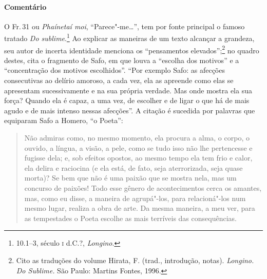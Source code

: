 \medskip

{\paragraph{Comentário} O Fr.\,31 ou \textit{Phaínetaí moi}, ``Parece"-me\ldots{}'', tem por fonte
principal o famoso tratado \textit{Do sublime}.\footnote{10.1--3, século \textsc{i} d.C.?, \textit{Longino}.} Ao
explicar as maneiras de um texto alcançar a grandeza, seu autor de incerta identidade menciona os
``pensamentos elevados'';\footnote{ Cito as traduções do volume Hirata,
F. (trad., introdução, notas). \textit{Longino.} \textit{Do Sublime.} São
Paulo: Martins Fontes, 1996.} no quadro destes, cita o fragmento de Safo,
em que louva a ``escolha dos motivos'' e a ``concentração dos
motivos escolhidos''. ``Por exemplo Safo: as afecções consecutivas ao delírio
amoroso, a cada vez, ela as apreende como elas se apresentam sucessivamente e
na sua própria verdade. Mas onde mostra ela sua força? Quando ela é capaz, a
uma vez, de escolher e de ligar o que há de mais agudo e de mais
intenso nessas afecções''. A citação é sucedida por palavras que equiparam Safo
a Homero, ``o Poeta'': 
\pagebreak
\begin{quote}
Não admiras como, no mesmo momento, ela
procura a alma, o corpo, o ouvido, a língua, a visão, a pele, como se tudo isso
não lhe pertencesse e fugisse dela; e, sob efeitos opostos, ao mesmo tempo ela
tem frio e calor, ela delira e raciocina (e ela está, de fato, seja
aterrorizada, seja quase morta)? Se bem que não é uma paixão que se mostra
nela, mas um concurso de paixões! Todo esse gênero de acontecimentos cerca os
amantes, mas, como eu disse, a maneira de agrupá"-los, para relacioná"-los num
mesmo lugar, realiza a obra de arte. Da mesma maneira, a meu ver, para as
tempestades o Poeta escolhe as mais terríveis das consequências.
\end{quote}

}
